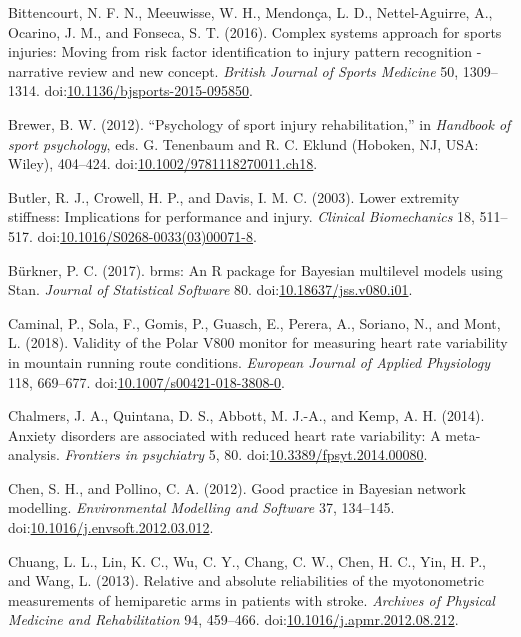 \documentclass[
]{frontiersHLTH}
\newlength{\cslhangindent}
\newenvironment{cslreferences}%
  {\setlength{\parindent}{0pt}%
  \everypar{\setlength{\hangindent}{\cslhangindent}}\ignorespaces}%
  {\par}
\begin{document}
\begin{cslreferences}
\leavevmode\hypertarget{ref-Bittencourt2016}{}%
Bittencourt, N. F. N., Meeuwisse, W. H., Mendonça, L. D.,
Nettel-Aguirre, A., Ocarino, J. M., and Fonseca, S. T. (2016). Complex
systems approach for sports injuries: Moving from risk factor
identification to injury pattern recognition - narrative review and new
concept. \emph{British Journal of Sports Medicine} 50, 1309--1314.
doi:\href{https://doi.org/10.1136/bjsports-2015-095850}{10.1136/bjsports-2015-095850}.

\leavevmode\hypertarget{ref-Brewer2012}{}%
Brewer, B. W. (2012). ``Psychology of sport injury rehabilitation,'' in
\emph{Handbook of sport psychology}, eds. G. Tenenbaum and R. C. Eklund
(Hoboken, NJ, USA: Wiley), 404--424.
doi:\href{https://doi.org/10.1002/9781118270011.ch18}{10.1002/9781118270011.ch18}.

\leavevmode\hypertarget{ref-Butler2003}{}%
Butler, R. J., Crowell, H. P., and Davis, I. M. C. (2003). Lower
extremity stiffness: Implications for performance and injury.
\emph{Clinical Biomechanics} 18, 511--517.
doi:\href{https://doi.org/10.1016/S0268-0033(03)00071-8}{10.1016/S0268-0033(03)00071-8}.

\leavevmode\hypertarget{ref-Burkner2017a}{}%
Bürkner, P. C. (2017). brms: An R package for Bayesian multilevel models
using Stan. \emph{Journal of Statistical Software} 80.
doi:\href{https://doi.org/10.18637/jss.v080.i01}{10.18637/jss.v080.i01}.

\leavevmode\hypertarget{ref-Caminal2018}{}%
Caminal, P., Sola, F., Gomis, P., Guasch, E., Perera, A., Soriano, N.,
and Mont, L. (2018). Validity of the Polar V800 monitor for measuring
heart rate variability in mountain running route conditions.
\emph{European Journal of Applied Physiology} 118, 669--677.
doi:\href{https://doi.org/10.1007/s00421-018-3808-0}{10.1007/s00421-018-3808-0}.

\leavevmode\hypertarget{ref-Chalmers2014}{}%
Chalmers, J. A., Quintana, D. S., Abbott, M. J.-A., and Kemp, A. H.
(2014). Anxiety disorders are associated with reduced heart rate
variability: A meta-analysis. \emph{Frontiers in psychiatry} 5, 80.
doi:\href{https://doi.org/10.3389/fpsyt.2014.00080}{10.3389/fpsyt.2014.00080}.

\leavevmode\hypertarget{ref-Chen2012}{}%
Chen, S. H., and Pollino, C. A. (2012). Good practice in Bayesian
network modelling. \emph{Environmental Modelling and Software} 37,
134--145.
doi:\href{https://doi.org/10.1016/j.envsoft.2012.03.012}{10.1016/j.envsoft.2012.03.012}.

\leavevmode\hypertarget{ref-Chuang2013}{}%
Chuang, L. L., Lin, K. C., Wu, C. Y., Chang, C. W., Chen, H. C., Yin, H.
P., and Wang, L. (2013). Relative and absolute reliabilities of the
myotonometric measurements of hemiparetic arms in patients with stroke.
\emph{Archives of Physical Medicine and Rehabilitation} 94, 459--466.
doi:\href{https://doi.org/10.1016/j.apmr.2012.08.212}{10.1016/j.apmr.2012.08.212}.


\end{cslreferences}
\end{document}
